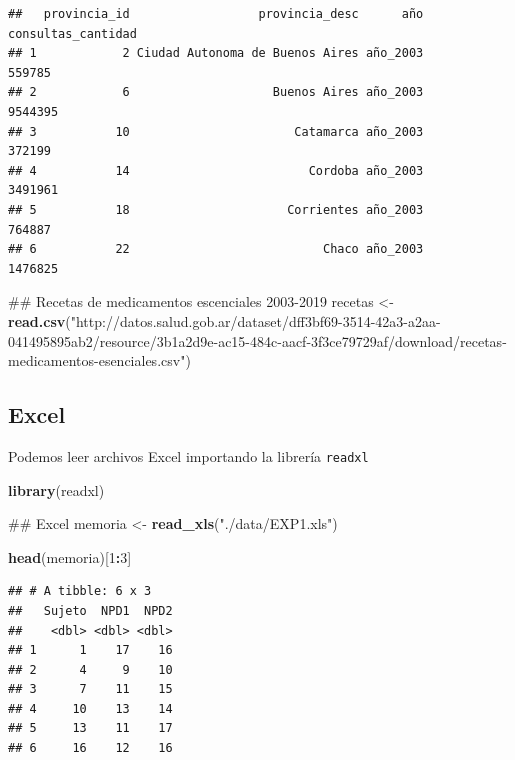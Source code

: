 \documentclass[spanish,]{book}
\newenvironment{Shaded}{\begin{snugshade}}{\end{snugshade}}
\newcommand{\KeywordTok}[1]{\textcolor[rgb]{0.13,0.29,0.53}{\textbf{#1}}}
\newcommand{\DecValTok}[1]{\textcolor[rgb]{0.00,0.00,0.81}{#1}}
\newcommand{\StringTok}[1]{\textcolor[rgb]{0.31,0.60,0.02}{#1}}
\newcommand{\OperatorTok}[1]{\textcolor[rgb]{0.81,0.36,0.00}{\textbf{#1}}}
\newcommand{\NormalTok}[1]{#1}
\begin{document}
\begin{verbatim}
##   provincia_id                  provincia_desc      año consultas_cantidad
## 1            2 Ciudad Autonoma de Buenos Aires año_2003             559785
## 2            6                    Buenos Aires año_2003            9544395
## 3           10                       Catamarca año_2003             372199
## 4           14                         Cordoba año_2003            3491961
## 5           18                      Corrientes año_2003             764887
## 6           22                           Chaco año_2003            1476825
\end{verbatim}

\begin{Shaded}
\begin{Highlighting}[]
\NormalTok{## Recetas de medicamentos escenciales 2003-2019}
\NormalTok{recetas <-}\StringTok{ }\KeywordTok{read.csv}\NormalTok{(}\StringTok{"http://datos.salud.gob.ar/dataset/dff3bf69-3514-42a3-a2aa-041495895ab2/resource/3b1a2d9e-ac15-484c-aacf-3f3ce79729af/download/recetas-medicamentos-esenciales.csv"}\NormalTok{)}
\end{Highlighting}
\end{Shaded}

\subsection{Excel}\label{excel}

Podemos leer archivos Excel importando la librería \texttt{readxl}

\begin{Shaded}
\begin{Highlighting}[]
\KeywordTok{library}\NormalTok{(readxl)}

\NormalTok{## Excel}
\NormalTok{memoria <-}\StringTok{ }\KeywordTok{read_xls}\NormalTok{(}\StringTok{"./data/EXP1.xls"}\NormalTok{)}

\KeywordTok{head}\NormalTok{(memoria)[}\DecValTok{1}\OperatorTok{:}\DecValTok{3}\NormalTok{]}
\end{Highlighting}
\end{Shaded}

\begin{verbatim}
## # A tibble: 6 x 3
##   Sujeto  NPD1  NPD2
##    <dbl> <dbl> <dbl>
## 1      1    17    16
## 2      4     9    10
## 3      7    11    15
## 4     10    13    14
## 5     13    11    17
## 6     16    12    16
\end{verbatim}
\end{document}
